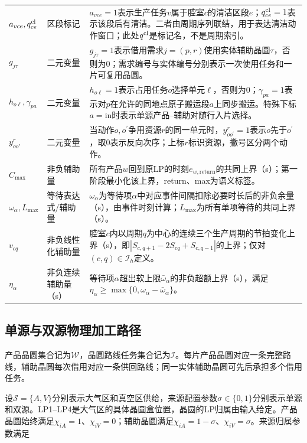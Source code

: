 \documentclass[final,5p,times,twocolumn]{elsarticle}
\begin{document}
\begin{table}[!t]
\begin{tabular}{C{0.23\textwidth}C{0.10\textwidth}C{0.61\textwidth}}
$a_{vce},q^{\rm cl}_{ce}$ & 区段标记 & $a_{vce}=1$表示生产任务$v$属于腔室$c$的清洁区段$e$；$q^{\rm cl}_{ce}=1$表示该段后有清洁。二者由周期序列联结，用于表达清洁动作窗口；此处$q^{\rm cl}$是标记名，不是周期索引。\\
$g_{j\tau}$ & 二元变量 & $g_{j\tau}=1$表示借用需求$j=(p,r)$使用实体辅助晶圆$\tau$，否则为0；需求编号与实体编号分别表示一次使用任务和一片可复用晶圆。\\
$h_{o\ell},\gamma_{pa}$ & 二元变量 & $h_{o\ell}=1$表示占用任务$o$选择单元$\ell$，否则为0；$\gamma_{pa}=1$表示对$p$在允许的同地点原子搬运段$a$上同步搬运。特殊下标$a=\mathrm{in}$时表示单源产品--辅助对随行入片选择。\\
$y^r_{oo'}$ & 二元变量 & 当动作$o,o^{\prime}$争用资源$r$的同一单元时，$y^r_{oo^{\prime}}=1$表示$o$先于$o^{\prime}$，取0表示反向次序；上标$r$标识资源，撇号区分两个动作。\\
$C_{\max}$ & 非负辅助量 & 所有产品$w$回到原LP的时刻$e_{w,\mathrm{return}}$的共同上界（s）；第一阶段最小化该上界，return、max为语义标签。\\
$\omega_\alpha,L_{\max}$ & 等待表达式/辅助量 & $\omega_\alpha$为等待项$\alpha$中对应事件间隔扣除必要时长后的非负余量（s），由事件时刻计算；$L_{\max}$为所有单项等待的共同上界（s）。\\
$v_{cq}$ & 非负线性化辅助量 & 腔室$c$内以周期$q$为中心的连续三个生产周期的节拍变化上界（s），即$|S_{c,q+1}-2S_{cq}+S_{c,q-1}|$的上界；仅对$(c,q)\in\mathcal I_h$定义。\\
$\eta_\alpha$ & 非负连续辅助量（s） & 等待项$\alpha$超出软上限$\bar\omega_\alpha$的非负超额上界（s），满足$\eta_\alpha\ge\max\{0,\omega_\alpha-\bar\omega_\alpha\}$。\\
\bottomrule
\end{tabular}
\end{table}

\subsection{单源与双源物理加工路径}
\label{sec:model-path-cn}

产品晶圆集合记为$\mathcal W$，晶圆路线任务集合记为$\mathcal I$。每片产品晶圆对应一条完整路线，辅助晶圆每次借用对应一条供回路线；同一实体辅助晶圆可先后承担多个借用任务。

设$\mathcal S=\{A,V\}$分别表示大气区和真空区供给，来源配置参数$\sigma\in\{0,1\}$分别表示单源和双源。LP1--LP4是大气区的具体晶圆盒位置，晶圆的LP归属由输入给定。产品晶圆始终满足$\chi_{iA}=1$、$\chi_{iV}=0$；辅助晶圆满足$\chi_{iA}=1-\sigma$、$\chi_{iV}=\sigma$。来源归属参数满足
\end{document}
